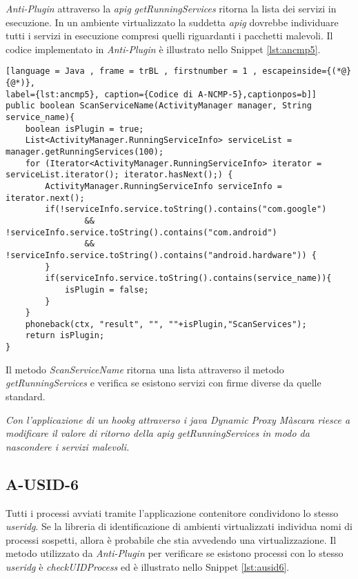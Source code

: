 \emph{Anti-Plugin} attraverso la \emph{\gls{apig}} \emph{getRunningServices} ritorna la lista dei servizi in esecuzione. In un ambiente virtualizzato la suddetta \emph{\gls{apig}} dovrebbe individuare tutti i servizi in esecuzione compresi quelli riguardanti i pacchetti malevoli. Il codice implementato in \emph{Anti-Plugin} è illustrato nello Snippet \ref{lst:ancmp5}.

\begin{lstlisting}[language = Java , frame = trBL , firstnumber = 1 , escapeinside={(*@}{@*)},
label={lst:ancmp5}, caption={Codice di A-NCMP-5},captionpos=b]]
public boolean ScanServiceName(ActivityManager manager, String service_name){
    boolean isPlugin = true;
    List<ActivityManager.RunningServiceInfo> serviceList = manager.getRunningServices(100);
    for (Iterator<ActivityManager.RunningServiceInfo> iterator = serviceList.iterator(); iterator.hasNext();) {
        ActivityManager.RunningServiceInfo serviceInfo = iterator.next();
        if(!serviceInfo.service.toString().contains("com.google")
                && !serviceInfo.service.toString().contains("com.android")
                && !serviceInfo.service.toString().contains("android.hardware")) {
        }
        if(serviceInfo.service.toString().contains(service_name)){
            isPlugin = false;
        }
    }
    phoneback(ctx, "result", "", ""+isPlugin,"ScanServices");
    return isPlugin;
}

\end{lstlisting}

Il metodo \emph{ScanServiceName} ritorna una lista attraverso il metodo \emph{getRunningServices} e verifica se esistono servizi con firme diverse da quelle standard.

\emph{Con l'applicazione di un \gls{hookg} attraverso i java Dynamic Proxy Màscara riesce a modificare il valore di ritorno della \gls{apig} getRunningServices in modo da nascondere i servizi malevoli.}


\newpage




\subsection*{A-USID-6}
\label{a-usid-6}

Tutti i processi avviati tramite l'applicazione contenitore condividono lo stesso \emph{\gls{useridg}}. Se la libreria di identificazione di ambienti virtualizzati individua nomi di processi sospetti, allora è probabile che stia avvedendo una virtualizzazione.
Il metodo utilizzato da \emph{Anti-Plugin} per verificare se esistono processi con lo stesso \emph{\gls{useridg}} è \emph{checkUIDProcess} ed è illustrato nello Snippet \ref{lst:ausid6}.

